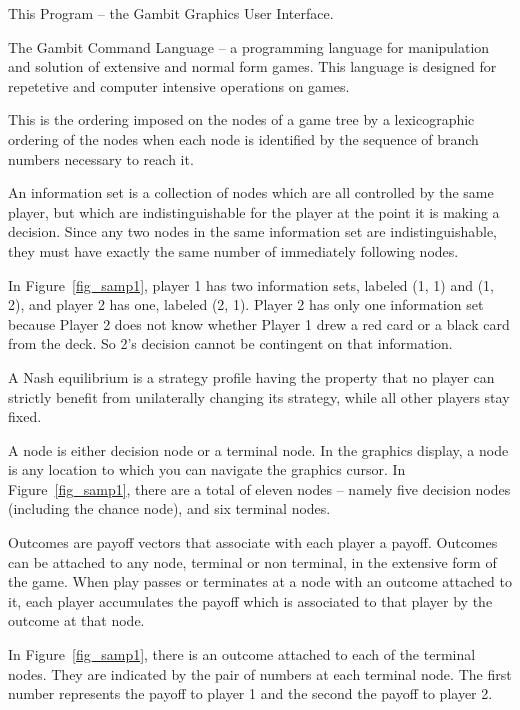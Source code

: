 \begin{helpglossary}
\label{guigloss}
This Program -- the Gambit Graphics User Interface.

\label{gclgloss}
The Gambit Command Language -- a programming language for manipulation and
solution of extensive and normal form games.  This language is designed
for repetetive and computer intensive operations on games.  

\label{indextravgloss}
This is the ordering imposed on the nodes of a game tree by a lexicographic 
ordering of the nodes when each node is identified by the sequence of branch 
numbers necessary to reach it.  

\label{infosetgloss}
An information set is a collection of nodes which are all controlled by
the same player, but which are indistinguishable 
for the player at the point it is making a decision.  Since any two nodes 
in the same information set are indistinguishable, they must have exactly 
the same number of immediately following nodes. 

In Figure~\ref{fig_samp1}, player 1 has two information
sets, labeled (1, 1) and (1, 2), and player 2 has one, labeled (2, 1).
Player 2 has only one information set because Player 2 does not know whether
 Player 1 drew a red card or a black card from the deck.  So 2's decision 
cannot be contingent on that information.

\label{nashequigloss}
A Nash equilibrium is a strategy profile having the property that no player 
can strictly benefit from unilaterally changing its strategy, while all 
other players stay fixed.  

\label{nodegloss}
A node is either decision node or a terminal node.  In the graphics 
display, a node is any location to which you can navigate the graphics 
cursor. In Figure~\ref{fig_samp1}, there are a total of eleven nodes -- namely 
five decision nodes (including the chance node), and six terminal nodes.  

\label{outcomegloss}
Outcomes are payoff vectors that associate with each player a payoff.  
Outcomes can be attached to any node, terminal or non terminal, in the 
extensive form of the game.  When play passes or terminates at a node 
with an outcome attached to it, each player accumulates the payoff which 
is associated to that player by the outcome at that node. 

In Figure~\ref{fig_samp1}, there is an outcome attached to each of the
terminal nodes.  They are indicated by the pair of numbers at each
terminal node.  The first number represents the payoff to player 1 and the
second the payoff to player 2.


\end{helpglossary}
